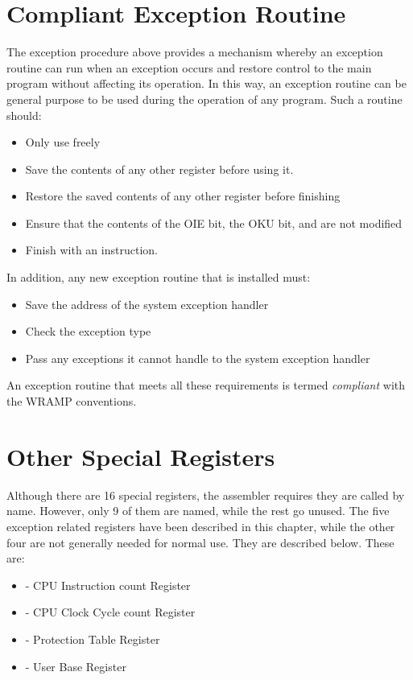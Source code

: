 \section{Compliant Exception Routine}

The exception procedure above provides a mechanism whereby an exception routine
can run when an exception occurs and restore control to the main program without
affecting its operation. In this way, an exception routine can be general
purpose to be used during the operation of any program. Such a routine should:

\begin{itemize}
\item Only use freely
\item Save the contents of any other register before using it.
\item Restore the saved contents of any other register before finishing
\item Ensure that the contents of the OIE bit, the OKU bit,  and
 are not modified
\item Finish with an  instruction.
\end{itemize}

In addition, any new exception routine that is installed must:

\begin{itemize}
\item Save the address of the system exception handler
\item Check the exception type
\item Pass any exceptions it cannot handle to the system exception handler
\end{itemize}

An exception routine that meets all these requirements is termed {\em compliant}
with the WRAMP conventions.

\section{Other Special Registers}

Although there are 16 special registers, the assembler requires they
are called by name. However, only 9 of them are named, while the rest go unused.
The five exception related registers have been described in this chapter,
while the other four are not generally needed for normal use. They are described
below. These are:

\begin{itemize}
\item {} - CPU Instruction count Register
\item {} - CPU Clock Cycle count Register
\item {} - Protection Table Register
\item {} - User Base Register
\end{itemize}

